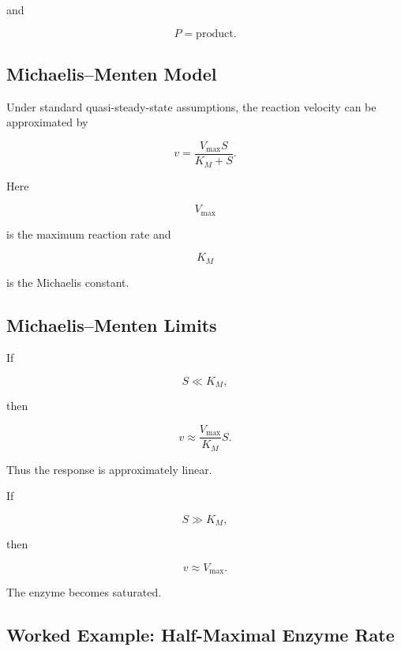 and

\[
P
=
\text{product}.
\]

\subsection{Michaelis--Menten Model}
\label{subsec:michaelis-menten}

Under standard quasi-steady-state assumptions, the reaction velocity can be
approximated by

\[
\boxed{
v
=
\frac{V_{\max}S}
{K_M+S}.
}
\]

Here

\[
V_{\max}
\]

is the maximum reaction rate and

\[
K_M
\]

is the Michaelis constant.

\subsection{Michaelis--Menten Limits}
\label{subsec:michaelis-menten-limits}

If

\[
S\ll K_M,
\]

then

\[
v
\approx
\frac{V_{\max}}{K_M}S.
\]

Thus the response is approximately linear.

If

\[
S\gg K_M,
\]

then

\[
\boxed{
v\approx V_{\max}.
}
\]

The enzyme becomes saturated.

\subsection{Worked Example: Half-Maximal Enzyme Rate}
\label{subsec:worked-michaelis-half}


